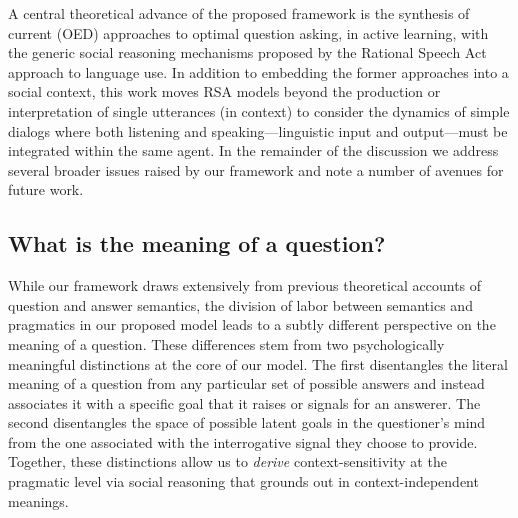 \documentclass[11pt, floatsintext]{apa6}
\begin{document}


A central theoretical advance of the proposed framework is the synthesis of current (OED) approaches to optimal question asking, in active learning, with the generic social reasoning mechanisms proposed by the Rational Speech Act approach to language use. 
In addition to embedding the former approaches into a social context, this work moves RSA models beyond the production or interpretation of single utterances (in context) to consider the dynamics of simple dialogs where both listening and speaking---linguistic input and output---must be integrated within the same agent. 
In the remainder of the discussion we address several broader issues raised by our framework and note a number of avenues for future work.

\subsection{What is the meaning of a question?}

While our framework draws extensively from previous theoretical accounts of question and answer semantics, the division of labor between semantics and pragmatics in our proposed model leads to a subtly different perspective on the meaning of a question. 
These differences stem from two psychologically meaningful distinctions at the core of our model.
The first disentangles the literal meaning of a question from any particular set of possible answers and instead associates it with a specific goal that it raises or signals for an answerer.
The second disentangles the space of possible latent goals in the questioner's mind from the one associated with the interrogative signal they choose to provide.
Together, these distinctions allow us to \emph{derive} context-sensitivity at the pragmatic level via social reasoning that grounds out in context-independent meanings.
\end{document}

